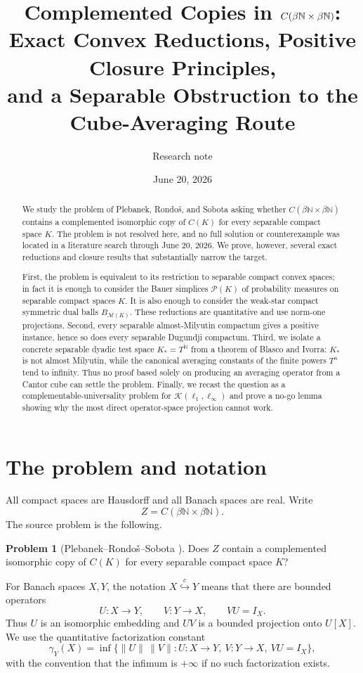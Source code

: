 \documentclass[11pt]{article}
\title{Complemented Copies in $\C(\bN\times\bN)$:\\
Exact Convex Reductions, Positive Closure Principles,\\
and a Separable Obstruction to the Cube-Averaging Route}
\author{Research note}
\date{June 20, 2026}
\theoremstyle{definition}
\newtheorem{problem}[theorem]{Problem}
\theoremstyle{remark}
\newcommand{\C}{C}
\newcommand{\bN}{\beta\mathbb N}
\newcommand{\Pp}{\mathcal P}
\newcommand{\M}{\mathcal M}
\newcommand{\Id}{I}
\newcommand{\Kop}{\mathcal K}
\newcommand{\hookc}{\stackrel{c}{\hookrightarrow}}
\begin{document}
\maketitle

\begin{abstract}
We study the problem of Plebanek, Rondo\v{s}, and Sobota asking whether
$\C(\beta\mathbb N\times\beta\mathbb N)$ contains a complemented isomorphic
copy of $\C(K)$ for every separable compact space $K$.  The problem is not
resolved here, and no full solution or counterexample was located in a
literature search through June 20, 2026.  We prove, however, several exact
reductions and closure results that substantially narrow the target.

First, the problem is equivalent to its restriction to separable compact
convex spaces; in fact it is enough to consider the Bauer simplices
$\Pp(K)$ of probability measures on separable compact spaces $K$.  It is
also enough to consider the weak-star compact symmetric dual balls
$B_{\M(K)}$.  These reductions are quantitative and use norm-one
projections.  Second, every separable almost-Milyutin compactum gives a
positive instance, hence so does every separable Dugundji compactum.  Third,
we isolate a concrete separable dyadic test space $K_*=T^{\mathbb N}$ from a
theorem of Blasco and Ivorra: $K_*$ is not almost Milyutin, while the
canonical averaging constants of the finite powers $T^n$ tend to infinity.
Thus no proof based solely on producing an averaging operator from a Cantor
cube can settle the problem.  Finally, we recast the question as a
complementable-universality problem for
$\Kop(\ell_1,\ell_\infty)$ and prove a no-go lemma showing why the most
direct operator-space projection cannot work.
\end{abstract}

\section{The problem and notation}

All compact spaces are Hausdorff and all Banach spaces are real.  Write
\[
        Z=\C(\bN\times\bN).
\]
The source problem is the following.

\begin{problem}[Plebanek--Rondo\v{s}--Sobota \cite{PRS26}]
Does $Z$ contain a complemented isomorphic copy of $\C(K)$ for every
separable compact space $K$?
\end{problem}

For Banach spaces $X,Y$, the notation $X\hookc Y$ means that there are
bounded operators
\[
        U:X\longrightarrow Y,
        \qquad V:Y\longrightarrow X,
        \qquad VU=\Id_X.
\]
Thus $U$ is an isomorphic embedding and $UV$ is a bounded projection onto
$U[X]$.  We use the quantitative factorization constant
\begin{equation}\label{eq:gamma}
 \gamma_Y(X)=\inf\bigl\{\|U\|\,\|V\|:U:X\to Y,\ V:Y\to X,\ VU=\Id_X\bigr\},
\end{equation}
with the convention that the infimum is $+\infty$ if no such factorization
exists.
\end{document}

